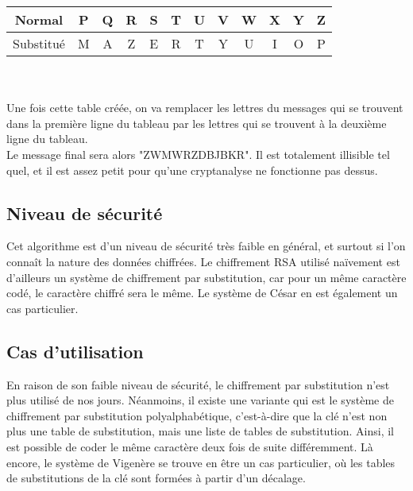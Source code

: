 			\begin{tabular}{ | c | c | c | c | c | c | c | c | c | c | c | c | }
				\hline
				Normal&P&Q&R&S&T&U&V&W&X&Y&Z\\ \hline
				Substitué&M&A&Z&E&R&T&Y&U&I&O&P\\
				\hline
			\end{tabular}\\
			\\
			Une fois cette table créée, on va remplacer les lettres du messages qui se trouvent dans la première ligne du tableau par les lettres qui se trouvent à la deuxième ligne du tableau.\\
			Le message final sera alors "ZWMWRZDBJBKR". Il est totalement illisible tel quel, et il est assez petit pour qu'une cryptanalyse ne fonctionne pas dessus.
		\subsection{Niveau de sécurité}
			Cet algorithme est d'un niveau de sécurité très faible en général, et surtout si l'on connaît la nature des données chiffrées. Le chiffrement RSA utilisé naïvement est d'ailleurs un système de chiffrement par substitution, car pour un même caractère codé, le caractère chiffré sera le même. Le système de César en est également un cas particulier.
		\subsection{Cas d'utilisation}
			En raison de son faible niveau de sécurité, le chiffrement par substitution n'est plus utilisé de nos jours. Néanmoins, il existe une variante qui est le système de chiffrement par substitution polyalphabétique, c'est-à-dire que la clé n'est non plus une table de substitution, mais une liste de tables de substitution. Ainsi, il est possible de coder le même caractère deux fois de suite différemment. Là encore, le système de Vigenère se trouve en être un cas particulier, où les tables de substitutions de la clé sont formées à partir d'un décalage.